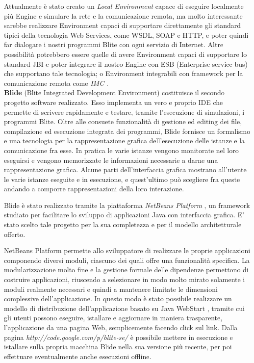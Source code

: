 Attualmente è stato creato un \emph{Local Environment} capace di eseguire
localmente più Engine e simulare la rete e la comunicazione remota, ma molto
interessante sarebbe realizzare Environment capaci di supportare direttamente gli
standard tipici della tecnologia Web Services, come WSDL, SOAP e HTTP, e poter
quindi far dialogare i nostri programmi Blite con ogni servizio di Internet.
Altre possibilità potrebbero essere quelle di avere Environment capaci
di supportare lo standard JBI \cite{JBI} e poter integrare il nostro Engine con ESB
(Enterprise service bus) che supportano tale tecnologia; o Environment
integrabili con framework per la comunicazione remota come \emph{IMC} \cite{IMC}.
\\

\textbf{Blide} (Blite Integrated Development Environment) costituisce il
secondo progetto software realizzato. Esso implementa un
vero e proprio IDE che permette di scrivere rapidamente e testare, tramite
l'esecuzione di simulazioni, i programmi Blite. Oltre alle consuete
funzionalità di gestione ed editing dei file, compilazione ed esecuzione
integrata dei programmi, Blide fornisce un formalismo e una tecnologia per la
rappresentazione grafica dell'esecuzione delle istanze e la comunicazione fra
esse. In pratica le varie istanze vengono monitorate nel loro eseguirsi e
vengono memorizzate le informazioni necessarie a darne una rappresentazione
grafica. Alcune parti dell'interfaccia grafica mostrano all'utente le varie
istanze eseguite e in esecuzione, e quest'ultimo può scegliere fra queste
andando a comporre rappresentazioni della loro interazione.

Blide è stato realizzato tramite la piattaforma \emph{NetBeans Platform}
\cite{NBPlatSite}, un framework studiato per facilitare lo sviluppo di applicazioni
Java con interfaccia grafica. E' stato scelto tale progetto per la sua
completezza e per il modello architetturale offerto. 

NetBeans Platform permette allo sviluppatore di realizzare le proprie
applicazioni componendo diversi moduli, ciascuno dei quali offre una
funzionalità specifica. La modularizzazione molto fine e la gestione
formale delle dipendenze permettono di costruire applicazioni, riuscendo a
selezionare in modo molto mirato solamente i moduli realmente necessari e
quindi a mantenere limitate le dimensioni complessive dell'applicazione. 
In questo modo è stato possibile realizzare un modello di distribuzione
dell'applicazione basato su Java WebStart \cite{JavaWS}, tramite cui gli utenti
possono eseguire, istallare e aggiornare in maniera trasparente, l'applicazione
da una pagina Web, semplicemente facendo click sul link. Dalla pagina 
\emph{http://code.google.com/p/blite-se/} è possibile mettere in esecuzione e
istallare sulla propria macchina Blide nella sua versione più recente, per poi
effettuare eventualmente anche esecuzioni offline.
\\

